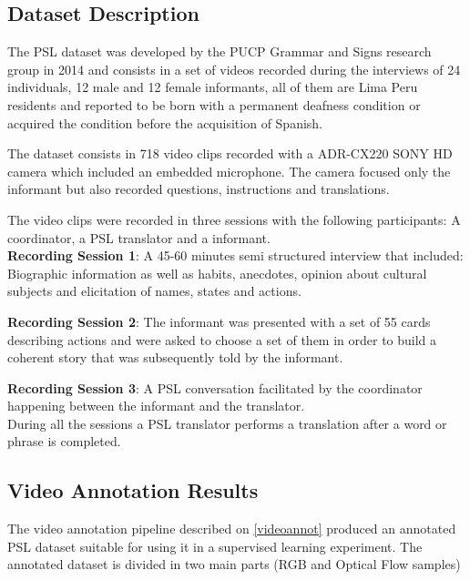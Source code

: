 \documentclass[twocolumn,conference]{article}
\begin{document}
\subsection{Dataset Description \cite{lsp_dataset}}\label{datasetdesc}
The PSL dataset was developed by the PUCP Grammar and Signs research group in 2014 and consists in a set of videos recorded during the interviews of 24 individuals, 12 male and 12 female informants, all of them are Lima Peru residents and reported to be born with a permanent deafness condition or acquired the condition before the acquisition of Spanish. 

The dataset consists in 718 video clips recorded with a ADR-CX220 SONY HD camera which included an embedded microphone. The camera focused only the informant but also recorded questions, instructions and translations.

The video clips were recorded in three sessions with the following participants: A coordinator, a PSL \cite{lsp_2015} translator and a informant.\\

\textbf{Recording Session 1}: A 45-60 minutes semi structured interview that included: Biographic information as well as habits, anecdotes, opinion about cultural subjects and elicitation of names, states and actions. 

\textbf{Recording Session 2}: The informant was presented with a set of 55 cards describing actions and were asked to choose a set of them in order to build a coherent story that was subsequently told by the informant.

\textbf{Recording Session 3}: A PSL \cite{lsp_2015} conversation facilitated by the coordinator happening between the informant and the translator.\\

During all the sessions a PSL \cite{lsp_2015} translator performs a translation after a word or phrase is completed.

\subsection{Video Annotation Results}\label{video-annotation-results}
The video annotation pipeline described on \ref{videoannot} produced an annotated PSL dataset suitable for using it in a supervised learning experiment. The annotated dataset is divided in two main parts (RGB and Optical Flow samples)
\end{document}
